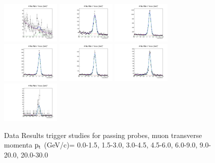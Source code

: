 \documentclass{article}
\begin{document}
\begin{figure}
    \includegraphics[width=0.25\textwidth]{../PlotsRooFitData/croofit_trg_pass_0.pdf}
    \includegraphics[width=0.25\textwidth]{../PlotsRooFitData/croofit_trg_pass_1.pdf}
    \includegraphics[width=0.25\textwidth]{../PlotsRooFitData/croofit_trg_pass_2.pdf}
    \includegraphics[width=0.25\textwidth]{../PlotsRooFitData/croofit_trg_pass_3.pdf}
    \includegraphics[width=0.25\textwidth]{../PlotsRooFitData/croofit_trg_pass_4.pdf}
    \includegraphics[width=0.25\textwidth]{../PlotsRooFitData/croofit_trg_pass_5.pdf}
    \includegraphics[width=0.25\textwidth]{../PlotsRooFitData/croofit_trg_pass_6.pdf}
    \caption{Data Results trigger studies for passing probes, muon transverse momenta
    $\rm p_{t}$ (GeV/c)= {0.0-1.5}, {1.5-3.0}, {3.0-4.5}, {4.5-6.0}, 
    {6.0-9.0}, {9.0-20.0}, {20.0-30.0}}
\end{figure}
\end{document}
